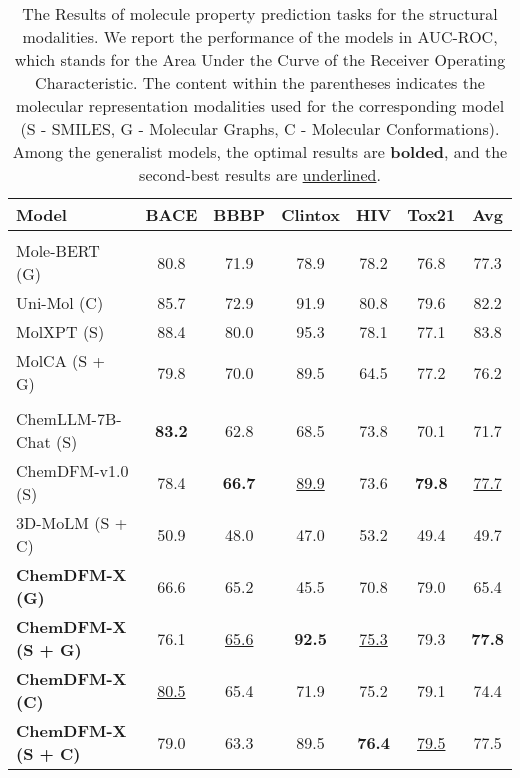 \begin{table*}
    \centering
    \begin{tabular}{lcccccc}
    \toprule
    Model & BACE & BBBP & Clintox & HIV & Tox21 & Avg \\
    \midrule
    \rowcolor{grey}\multicolumn{7}{c}{\textit{specialist models}} \\
    Mole-BERT (G)~\cite{xia2023molebert} & 80.8 & 71.9 & 78.9 & 78.2 & 76.8 & 77.3 \\
    Uni-Mol (C)~\cite{zhou2023unimol} & 85.7 & 72.9 & 91.9 & 80.8 & 79.6 & 82.2 \\
    MolXPT (S)~\cite{liu-etal-2023-molxpt} & 88.4 & 80.0 & 95.3 & 78.1 & 77.1 & 83.8 \\
    MolCA (S + G)~\cite{liu-etal-2023-molca} & 79.8 & 70.0 & 89.5 & 64.5 & 77.2 & 76.2 \\
    \midrule
    \rowcolor{grey}\multicolumn{7}{c}{\textit{generalist models}} \\
    ChemLLM-7B-Chat (S)~\cite{zhang2024chemllm} & \textbf{83.2} & 62.8 & 68.5 & 73.8 & 70.1 & 71.7 \\
    ChemDFM-v1.0 (S)~\cite{zhao2024chemdfm} & 78.4 & \textbf{66.7} & \underline{89.9} & 73.6 & \textbf{79.8} & \underline{77.7} \\
    3D-MoLM (S + C)~\cite{li2024molm} & 50.9 & 48.0 & 47.0 & 53.2 & 49.4 & 49.7\\
    \multirow{1}{*}{\textbf{ChemDFM-X (G)}} & 66.6 & 65.2 & 45.5 & 70.8 & 79.0 & 65.4 \\
    \multirow{1}{*}{\textbf{ChemDFM-X (S + G)}} & 76.1 & \underline{65.6} & \textbf{92.5} & \underline{75.3} & 79.3 & \textbf{77.8} \\
    \multirow{1}{*}{\textbf{ChemDFM-X (C)}} & \underline{80.5} & 65.4 & 71.9 & 75.2 & 79.1 & 74.4 \\
    \multirow{1}{*}{\textbf{ChemDFM-X (S + C)}} & 79.0 & 63.3 & 89.5 & \textbf{76.4} & \underline{79.5} & 77.5 \\
    \bottomrule
    \end{tabular}
    \caption{The Results of molecule property prediction tasks for the structural modalities. We report the performance of the models in AUC-ROC, which stands for the Area Under the Curve of the Receiver Operating Characteristic. The content within the parentheses indicates the molecular representation modalities used for the corresponding model (S - SMILES, G - Molecular Graphs, C - Molecular Conformations). Among the generalist models, the optimal results are \textbf{bolded}, and the second-best results are \underline{underlined}.}
    \label{tab:struct-molnet}
\end{table*}

